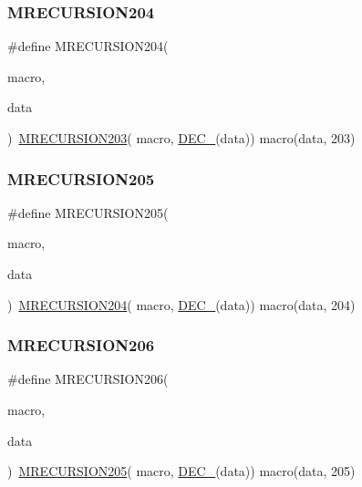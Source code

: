 \subsubsection{\texorpdfstring{MRECURSION204}{MRECURSION204}}
{\footnotesize\ttfamily \#define M\+R\+E\+C\+U\+R\+S\+I\+O\+N204(\begin{DoxyParamCaption}\item[{}]{macro,  }\item[{}]{data }\end{DoxyParamCaption})~\mbox{\hyperlink{group__group__sam0__utils__mrecursion_ga443a104f6a9c261eb7f07f7103820e5a}{M\+R\+E\+C\+U\+R\+S\+I\+O\+N203}}(  macro, \mbox{\hyperlink{group__group__sam0__utils__mrecursion_ga1d23d683797679dca8c3512a54a5dcae}{D\+E\+C\+\_\+}}(data))   macro(data, 203)}

\mbox{\label{group__group__sam0__utils__mrecursion_ga0a13dd4989c1ccfadd8c416bd616162a}} 
\subsubsection{\texorpdfstring{MRECURSION205}{MRECURSION205}}
{\footnotesize\ttfamily \#define M\+R\+E\+C\+U\+R\+S\+I\+O\+N205(\begin{DoxyParamCaption}\item[{}]{macro,  }\item[{}]{data }\end{DoxyParamCaption})~\mbox{\hyperlink{group__group__sam0__utils__mrecursion_ga194c82ac419aa1f8e626e2e8e9211b01}{M\+R\+E\+C\+U\+R\+S\+I\+O\+N204}}(  macro, \mbox{\hyperlink{group__group__sam0__utils__mrecursion_ga1d23d683797679dca8c3512a54a5dcae}{D\+E\+C\+\_\+}}(data))   macro(data, 204)}

\mbox{\label{group__group__sam0__utils__mrecursion_gaabaf99cc947f3217c4a84585f4674b79}} 
\subsubsection{\texorpdfstring{MRECURSION206}{MRECURSION206}}
{\footnotesize\ttfamily \#define M\+R\+E\+C\+U\+R\+S\+I\+O\+N206(\begin{DoxyParamCaption}\item[{}]{macro,  }\item[{}]{data }\end{DoxyParamCaption})~\mbox{\hyperlink{group__group__sam0__utils__mrecursion_ga0a13dd4989c1ccfadd8c416bd616162a}{M\+R\+E\+C\+U\+R\+S\+I\+O\+N205}}(  macro, \mbox{\hyperlink{group__group__sam0__utils__mrecursion_ga1d23d683797679dca8c3512a54a5dcae}{D\+E\+C\+\_\+}}(data))   macro(data, 205)}

